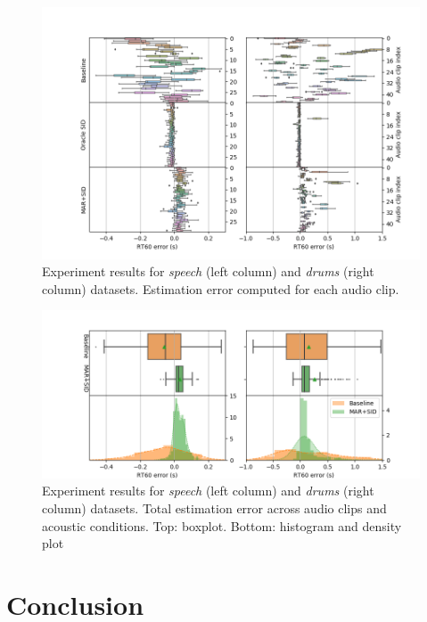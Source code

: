 \begin{figure}[htbp]
	\centerline{\includegraphics[width=1.3\textwidth]{Figures/ReverberationTimeEstimation/96.png}}
	\caption{Experiment results for \textit{speech} (left column) and \textit{drums} (right column) datasets. Estimation error computed for each audio clip.}
	\label{fig:results1}
\end{figure}
\begin{figure}[htbp]
	\centerline{\includegraphics[width=1.2\textwidth]{Figures/ReverberationTimeEstimation/94.png}}
	\caption{Experiment results for \textit{speech} (left column) and \textit{drums} (right column) datasets. Total estimation error across audio clips and acoustic conditions. Top: boxplot. Bottom: histogram and density plot}
	\label{fig:results2}
\end{figure}




\section{Conclusion}
\label{sec:conclusion}

